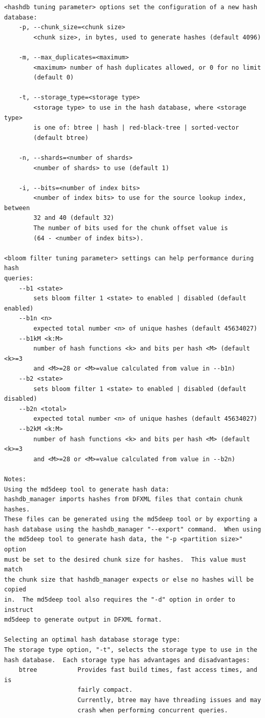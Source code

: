 \documentclass[11pt,twoside]{article}
\begin{document}
\begin{small}
\begin{verbatim}
<hashdb tuning parameter> options set the configuration of a new hash
database:
    -p, --chunk_size=<chunk size>
        <chunk size>, in bytes, used to generate hashes (default 4096)

    -m, --max_duplicates=<maximum>
        <maximum> number of hash duplicates allowed, or 0 for no limit
        (default 0)

    -t, --storage_type=<storage type>
        <storage type> to use in the hash database, where <storage type>
        is one of: btree | hash | red-black-tree | sorted-vector
        (default btree)

    -n, --shards=<number of shards>
        <number of shards> to use (default 1)

    -i, --bits=<number of index bits>
        <number of index bits> to use for the source lookup index, between
        32 and 40 (default 32)
        The number of bits used for the chunk offset value is
        (64 - <number of index bits>).

<bloom filter tuning parameter> settings can help performance during hash
queries:
    --b1 <state>
        sets bloom filter 1 <state> to enabled | disabled (default enabled)
    --b1n <n>
        expected total number <n> of unique hashes (default 45634027)
    --b1kM <k:M>
        number of hash functions <k> and bits per hash <M> (default <k>=3
        and <M>=28 or <M>=value calculated from value in --b1n)
    --b2 <state>
        sets bloom filter 1 <state> to enabled | disabled (default disabled)
    --b2n <total>
        expected total number <n> of unique hashes (default 45634027)
    --b2kM <k:M>
        number of hash functions <k> and bits per hash <M> (default <k>=3
        and <M>=28 or <M>=value calculated from value in --b2n)

Notes:
Using the md5deep tool to generate hash data:
hashdb_manager imports hashes from DFXML files that contain chunk hashes.
These files can be generated using the md5deep tool or by exporting a
hash database using the hashdb_manager "--export" command.  When using
the md5deep tool to generate hash data, the "-p <partition size>" option
must be set to the desired chunk size for hashes.  This value must match
the chunk size that hashdb_manager expects or else no hashes will be copied
in.  The md5deep tool also requires the "-d" option in order to instruct
md5deep to generate output in DFXML format.

Selecting an optimal hash database storage type:
The storage type option, "-t", selects the storage type to use in the
hash database.  Each storage type has advantages and disadvantages:
    btree           Provides fast build times, fast access times, and is
                    fairly compact.
                    Currently, btree may have threading issues and may
                    crash when performing concurrent queries.


\end{verbatim}
\end{small}
\end{document}
